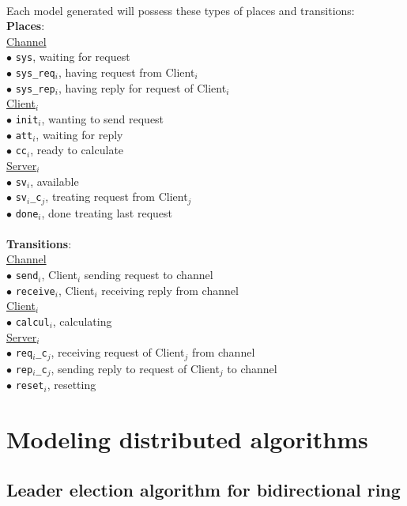 \documentclass{article}
\begin{document}
	\\Each model generated will possess these types of places and transitions:
		\\\textbf{Places}:
		\\\underline{Channel}
		\\$\bullet$ \texttt{sys}, waiting for request
		\\$\bullet$ \texttt{sys\_req$_{i}$}, having request from Client$_i$
		\\$\bullet$ \texttt{sys\_rep$_{i}$}, having reply for request of Client$_i$
		\\
		\underline{Client$_i$}
		\\$\bullet$ \texttt{init$_i$}, wanting to send request
		\\$\bullet$ \texttt{att$_i$}, waiting for reply
		\\$\bullet$ \texttt{cc$_i$}, ready to calculate
		\\
		\underline{Server$_i$}
		\\$\bullet$ \texttt{sv$_i$}, available
		\\$\bullet$ \texttt{sv$_i$\_c$_j$}, treating request from Client$_j$
		\\$\bullet$ \texttt{done$_i$}, done treating last request
		\\\\\textbf{Transitions}:
		\\\underline{Channel}
		\\$\bullet$ \texttt{send$_i$}, Client$_i$ sending request to channel
		\\$\bullet$ \texttt{receive$_i$}, Client$_i$ receiving reply from channel
		\\\underline{Client$_i$}
		\\$\bullet$ \texttt{calcul$_i$}, calculating
		\\\underline{Server$_i$}
		\\$\bullet$ \texttt{req$_i$\_c$_j$}, receiving request of Client$_j$ from channel
		\\$\bullet$ \texttt{rep$_i$\_c$_j$}, sending reply to request of Client$_j$ to channel
		\\$\bullet$ \texttt{reset$_i$}, resetting

	\section{Modeling distributed algorithms}
	\subsection{Leader election algorithm for bidirectional ring}
\end{document}
